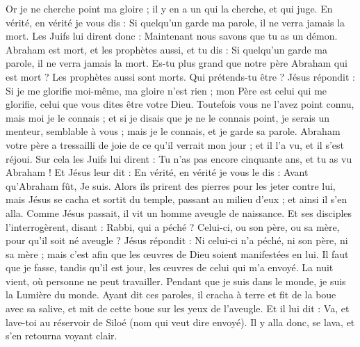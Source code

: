 \begin{multicols}{2}
Or je ne cherche point ma gloire ; il y en a un qui la cherche, et qui juge.
En vérité, en vérité je vous dis : Si quelqu'un garde ma parole, il ne verra jamais la mort.
Les Juifs lui dirent donc : Maintenant nous savons que tu as un démon. Abraham est mort, et les prophètes aussi, et tu dis : Si quelqu'un garde ma parole, il ne verra jamais la mort.
Es-tu plus grand que notre père Abraham qui est mort ? Les prophètes aussi sont morts. Qui prétends-tu être ?
Jésus répondit : Si je me glorifie moi-même, ma gloire n'est rien ; mon Père est celui qui me glorifie, celui que vous dites être votre Dieu.
Toutefois vous ne l'avez point connu, mais moi je le connais ; et si je disais que je ne le connais point, je serais un menteur, semblable à vous ; mais je le connais, et je garde sa parole.
Abraham votre père a tressailli de joie de ce qu'il verrait mon jour ; et il l'a vu, et il s'est réjoui.
Sur cela les Juifs lui dirent : Tu n'as pas encore cinquante ans, et tu as vu Abraham !
Et Jésus leur dit : En vérité, en vérité je vous le dis : Avant qu'Abraham fût, Je suis.
Alors ils prirent des pierres pour les jeter contre lui, mais Jésus se cacha et sortit du temple, passant au milieu d'eux ; et ainsi il s'en alla.
\VerseOne{}Comme Jésus passait, il vit un homme aveugle de naissance.
Et ses disciples l'interrogèrent, disant : Rabbi, qui a péché ? Celui-ci, ou son père, ou sa mère, pour qu'il soit né aveugle ?
Jésus répondit : Ni celui-ci n'a péché, ni son père, ni sa mère ; mais c'est afin que les œuvres de Dieu soient manifestées en lui.
Il faut que je fasse, tandis qu'il est jour, les œuvres de celui qui m'a envoyé. La nuit vient, où personne ne peut travailler.
Pendant que je suis dans le monde, je suis la Lumière du monde.
Ayant dit ces paroles, il cracha à terre et fit de la boue avec sa salive, et mit de cette boue sur les yeux de l'aveugle.
Et il lui dit : Va, et lave-toi au réservoir de Siloé (nom qui veut dire envoyé). Il y alla donc, se lava, et s'en retourna voyant clair.

\end{multicols}
